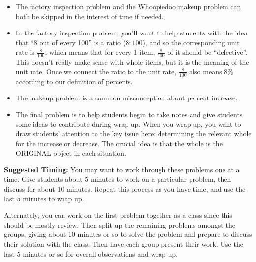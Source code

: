 \documentclass[noauthor,nooutcomes, handout]{ximera}
\begin{document}
\begin{instructorNotes}
\begin{itemize}
	\item The factory inspection problem and the Whoopiedoo makeup problem can both be skipped in the interest of time if needed.
	\item In the factory inspection problem, you'll want to help students with the idea that ``8 out of every 100'' is a ratio ($8:100$), and so the corresponding unit rate is $\frac{8}{100}$, which means that for every 1 item, $\frac{8}{100}$ of it should be ``defective''. This doesn't really make sense with whole items, but it is the meaning of the unit rate. Once we connect the ratio to the unit rate, $\frac{8}{100}$ also means $8\%$ according to our definition of percents. 
	\item The makeup problem is a common misconception about percent increase.
	\item The final problem is to help students begin to take notes and give students some ideas to contribute during  wrap-up. When you wrap up, you want to draw students' attention to the key issue here: determining the relevant whole for the increase or decrease. The crucial idea is that the whole is the ORIGINAL object in each situation.


	
\end{itemize}


{\bf Suggested Timing:} You may want to work through these problems one at a time. Give students about 5 minutes to work on a particular problem, then discuss for about 10 minutes. Repeat this process as you have time, and use the last 5 minutes to wrap up. 

Alternately, you can work on the first problem together as a class since this should be mostly review. Then split up the remaining problems amongst the groups, giving about 10 minutes or so to solve the problem and prepare to discuss their solution with the class. Then have each group present their work. Use the last 5 minutes or so for overall observations and wrap-up.

\end{instructorNotes}
\end{document}
